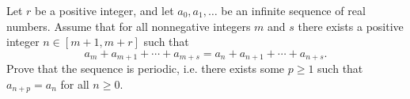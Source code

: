 Let $r$ be a positive integer, and let $a_0, a_1, \ldots$ be an infinite sequence of real numbers. Assume that for all nonnegative integers $m$ and $s$ there exists a positive integer $n \in [m+1, m+r]$ such that
\[
a_m + a_{m+1} + \cdots + a_{m+s} = a_n + a_{n+1} + \cdots + a_{n+s}.
\]
Prove that the sequence is periodic, i.e. there exists some $p \geq 1$ such that $a_{n+p} = a_n$ for all $n \geq 0$.
